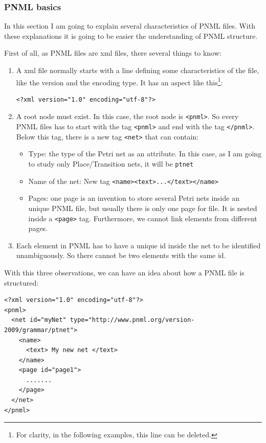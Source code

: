 \subsubsection{PNML basics}

In this section I am going to explain several characteristics of PNML files.
With these explanations it is going to be easier the understanding of PNML
structure.

First of all, as PNML files are xml files, there several things to know:

\begin{enumerate}
\item 
  A xml file normally starts with a line defining some characteristics of
  the file, like the version and the encoding type. It has an aspect like
  this\footnote{For clarity, in the following examples, this line can be deleted.}: 

\begin{lstlisting}
<?xml version="1.0" encoding="utf-8"?>
\end{lstlisting}
  
 
\item
  A root node must exist.
  In this case, the root node is \texttt{<pnml>}.
  So every PNML files has to start with the tag \texttt{<pnml>} and end with the tag \texttt{</pnml>}.
Below this tag, there is a new tag \texttt{<net>} that can contain:
  \begin{itemize}
  \item Type: the type of the Petri net as an attribute. In this case, as
    I  am going to study only Place/Transition nets, it will  be \texttt{ptnet}
  \item Name of the net: New tag \texttt{<name><text>...</text></name>}
  \item Pages: one page is an invention to store several Petri nets inside
  an unique PNML file, but usually there is only one page for file. It is
  nested inside a \texttt{<page>} tag.
Furthermore, we cannot link elements from different pages.  \end{itemize}
  \item
  Each element in PNML has to have a unique id inside the net to be identified
unambiguously. So there cannot
  be two elements with the same id.
\end{enumerate}

 

With this three observations, we can have an idea about how a PNML file
is structured:  

 
\begin{lstlisting}[label=pnml_net_page,caption=Example of general PNML file]
<?xml version="1.0" encoding="utf-8"?>
<pnml>
  <net id="myNet" type="http://www.pnml.org/version-2009/grammar/ptnet">
    <name>
      <text> My new net </text>
    </name>
    <page id="page1">
      .......
    </page>
  </net>
</pnml>
\end{lstlisting}

